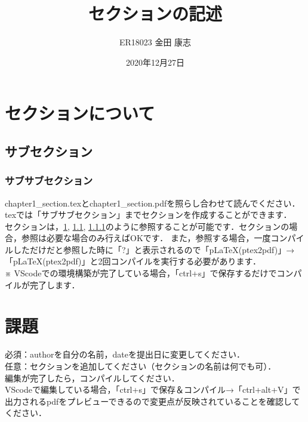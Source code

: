 \documentclass[a4paper,10pt]{jsarticle}
\title{セクションの記述}%
\author{ER18023 金田 康志}%
\date{2020年12月27日}%
\begin{document}
\maketitle%
\section{セクションについて}
\label{sec:label1}
\subsection{サブセクション}
\label{sec:label2}
\subsubsection{サブサブセクション}
\label{sec:label3}
chapter1\_section.texとchapter1\_section.pdfを照らし合わせて読んでください．\\

texでは「サブサブセクション」までセクションを作成することができます．\\
セクションは，\ref{sec:label1}, \ref{sec:label2}, \ref{sec:label3}のように参照することが可能です．セクションの場合，参照は必要な場合のみ行えばOKです．
また，参照する場合，一度コンパイルしただけだと参照した時に「?」と表示されるので「pLaTeX(ptex2pdf)」→「pLaTeX(ptex2pdf)」と2回コンパイルを実行する必要があります．\\
※ VScodeでの環境構築が完了している場合，「ctrl+s」で保存するだけでコンパイルが完了します．

\section{課題}
\noindent 必須：authorを自分の名前，dateを提出日に変更してください．\\
任意：セクションを追加してください（セクションの名前は何でも可）．\\

\noindent 編集が完了したら，コンパイルしてください．\\
VScodeで編集している場合，「ctrl+s」で保存＆コンパイル→「ctrl+alt+V」で出力されるpdfをプレビューできるので変更点が反映されていることを確認してください．
\end{document}
